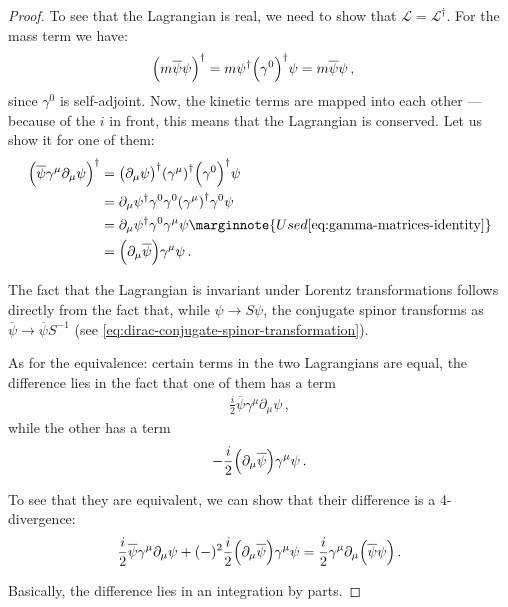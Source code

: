 \documentclass[main.tex]{subfiles}
\begin{document}
\begin{proof}
To see that the Lagrangian is real, we need to show that \(\mathscr{L} = \mathscr{L} ^\dag\). For the mass term we have: 
%
\begin{align}
\qty(m \overline{\psi} \psi ) ^\dag &= m \psi ^\dag \qty(\gamma^{0} )^\dag \psi = m \overline{\psi} \psi 
\,,
\end{align}
%
since \(\gamma^{0}\) is self-adjoint. Now, the kinetic terms are mapped into each other --- because of the \(i\) in front, this means that the Lagrangian is conserved. Let us show it for one of them: 
%
\begin{align}
\qty(\overline{\psi} \gamma^{\mu } \partial_{\mu } \psi )^\dag &=
\qty(\partial_{\mu } \psi ) ^\dag \qty(\gamma^{\mu })^\dag \qty(\gamma^{0})^\dag \psi  \\
&= \partial_{\mu } \psi ^\dag \gamma^{0} \gamma^{0} \qty(\gamma^{\mu }) ^\dag \gamma^{0} \psi  \\
&= \partial_{\mu } \psi ^\dag \gamma^{0} \gamma^{\mu } \psi  \marginnote{Used \eqref{eq:gamma-matrices-identity}}\\
&= \qty(\partial_{\mu } \overline{\psi}) \gamma^{\mu } \psi 
\,.
\end{align}

The fact that the Lagrangian is invariant under Lorentz transformations follows directly from the fact that, while \(\psi \to S \psi \), the conjugate spinor transforms as \(\overline{\psi} \to \overline{\psi} S^{-1}\) (see \eqref{eq:dirac-conjugate-spinor-transformation}). 

As for the equivalence: certain terms in the two Lagrangians are equal, the difference lies in the fact that one of them has a term 
%
\begin{align}
\frac{i}{2} \overline{\psi} \gamma^{\mu } \partial_{\mu } \psi 
\,,
\end{align}
%
while the other has a term 
%
\begin{align}
- \frac{i}{2} \qty(\partial_{\mu } \overline{\psi}) \gamma^{\mu } \psi  
\,.
\end{align}

To see that they are equivalent, we can show that their difference is a 4-divergence: 
%
\begin{align}
\frac{i}{2} \overline{\psi} \gamma^{\mu } \partial_{\mu } \psi + (-)^2 \frac{i}{2} \qty(\partial_{\mu } \overline{\psi} )\gamma^{\mu } \psi 
= \frac{i}{2} \gamma^{\mu } \partial_{\mu } \qty(\overline{\psi} \psi )
\,.
\end{align}

Basically, the difference lies in an integration by parts. 
\end{proof}
\end{document}
